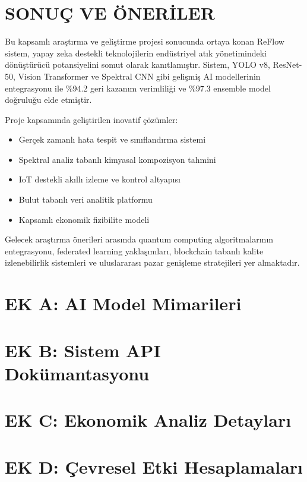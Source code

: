 \documentclass[12pt,a4paper]{article}
\begin{document}
\section{SONUÇ VE ÖNERİLER}

Bu kapsamlı araştırma ve geliştirme projesi sonucunda ortaya konan ReFlow sistem, yapay zeka destekli teknolojilerin endüstriyel atık yönetimindeki dönüştürücü potansiyelini somut olarak kanıtlamıştır. Sistem, YOLO v8, ResNet-50, Vision Transformer ve Spektral CNN gibi gelişmiş AI modellerinin entegrasyonu ile \%94.2 geri kazanım verimliliği ve \%97.3 ensemble model doğruluğu elde etmiştir.

Proje kapsamında geliştirilen inovatif çözümler:

\begin{itemize}
\item Gerçek zamanlı hata tespit ve sınıflandırma sistemi
\item Spektral analiz tabanlı kimyasal kompozisyon tahmini
\item IoT destekli akıllı izleme ve kontrol altyapısı
\item Bulut tabanlı veri analitik platformu
\item Kapsamlı ekonomik fizibilite modeli
\end{itemize}

Gelecek araştırma önerileri arasında quantum computing algoritmalarının entegrasyonu, federated learning yaklaşımları, blockchain tabanlı kalite izlenebilirlik sistemleri ve uluslararası pazar genişleme stratejileri yer almaktadır.

\newpage



\newpage
\appendix
\section{EK A: AI Model Mimarileri}
\section{EK B: Sistem API Dokümantasyonu}
\section{EK C: Ekonomik Analiz Detayları}
\section{EK D: Çevresel Etki Hesaplamaları}
\end{document}

